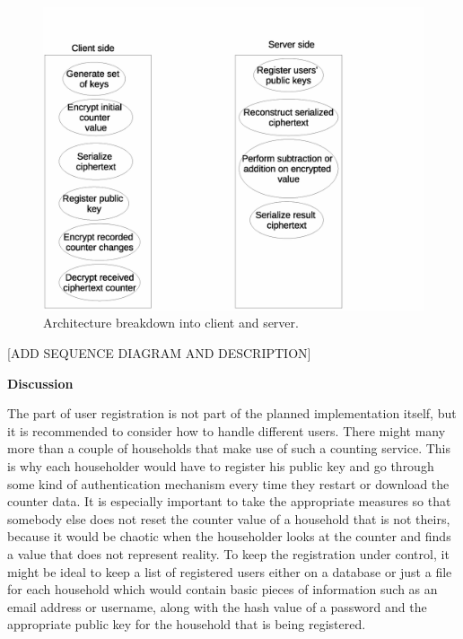 \begin{figure}[h!]
  \centering 
  \includegraphics[scale=0.7]{clientserver}
  \caption{Architecture breakdown into client and server.}
\end{figure}

[ADD SEQUENCE DIAGRAM AND DESCRIPTION]


\textbf{Discussion}

The part of user registration is not part of the planned implementation itself, but it is recommended to consider how to handle different users. There might many more than a couple of households that make use of such a counting service. This is why each householder would have to register his public key and go through some kind of authentication mechanism every time they restart or download the counter data. It is especially important to take the appropriate measures so that somebody else does not reset the counter value of a household that is not theirs, because it would be chaotic when the householder looks at the counter and finds a value that does not represent reality.
To keep the registration under control, it might be ideal to keep a list of registered users either on a database or just a file for each household which would contain basic pieces of information such as an email address or username, along with the hash value of a password and the appropriate public key for the household that is being registered.

